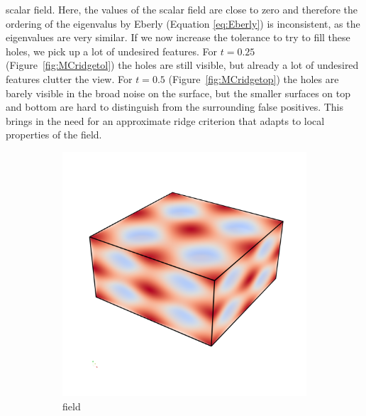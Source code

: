scalar field. Here, the values of the scalar field are close to zero and
therefore the ordering of the eigenvalus by Eberly (Equation
\ref{eq:Eberly}) is inconsistent, as the eigenvalues are very similar.
If we now increase the tolerance to try to fill these holes, we pick up
a lot of undesired features. For $t=0.25$ (Figure~\ref{fig:MCridgetol})
the holes are still visible, but already a lot of undesired features
clutter the view. For $t=0.5$ (Figure~\ref{fig:MCridgetop}) the holes are
barely visible in the broad noise on the surface, but the smaller surfaces
on top and bottom are hard to distinguish from the surrounding false
positives. This brings in the need for an approximate ridge criterion
that adapts to local properties of the field.

\begin{figure}
    \begin{subfigure}[b]{0.49\textwidth}
        \includegraphics[width=\textwidth]{Images/sfield.png}
        \caption{field}
    \end{subfigure}
    \begin{subfigure}[b]{0.49\textwidth}

\end{subfigure}
\end{figure}
